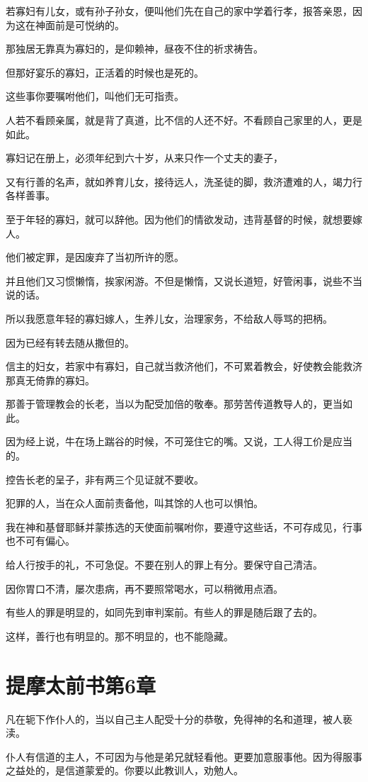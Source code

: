 \documentclass[12pt,oneside]{book}
\begin{document}
若寡妇有儿女，或有孙子孙女，便叫他们先在自己的家中学着行孝，报答亲恩，因为这在神面前是可悦纳的。

那独居无靠真为寡妇的，是仰赖神，昼夜不住的祈求祷告。

但那好宴乐的寡妇，正活着的时候也是死的。

这些事你要嘱咐他们，叫他们无可指责。

人若不看顾亲属，就是背了真道，比不信的人还不好。不看顾自己家里的人，更是如此。

寡妇记在册上，必须年纪到六十岁，从来只作一个丈夫的妻子，

又有行善的名声，就如养育儿女，接待远人，洗圣徒的脚，救济遭难的人，竭力行各样善事。

至于年轻的寡妇，就可以辞他。因为他们的情欲发动，违背基督的时候，就想要嫁人。

他们被定罪，是因废弃了当初所许的愿。

并且他们又习惯懒惰，挨家闲游。不但是懒惰，又说长道短，好管闲事，说些不当说的话。

所以我愿意年轻的寡妇嫁人，生养儿女，治理家务，不给敌人辱骂的把柄。

因为已经有转去随从撒但的。

信主的妇女，若家中有寡妇，自己就当救济他们，不可累着教会，好使教会能救济那真无倚靠的寡妇。

那善于管理教会的长老，当以为配受加倍的敬奉。那劳苦传道教导人的，更当如此。

因为经上说，牛在场上踹谷的时候，不可笼住它的嘴。又说，工人得工价是应当的。

控告长老的呈子，非有两三个见证就不要收。

犯罪的人，当在众人面前责备他，叫其馀的人也可以惧怕。

我在神和基督耶稣并蒙拣选的天使面前嘱咐你，要遵守这些话，不可存成见，行事也不可有偏心。

给人行按手的礼，不可急促。不要在别人的罪上有分。要保守自己清洁。

因你胃口不清，屡次患病，再不要照常喝水，可以稍微用点酒。

有些人的罪是明显的，如同先到审判案前。有些人的罪是随后跟了去的。

这样，善行也有明显的。那不明显的，也不能隐藏。

\chapter{提摩太前书第6章}
凡在轭下作仆人的，当以自己主人配受十分的恭敬，免得神的名和道理，被人亵渎。

仆人有信道的主人，不可因为与他是弟兄就轻看他。更要加意服事他。因为得服事之益处的，是信道蒙爱的。你要以此教训人，劝勉人。
\end{document}
